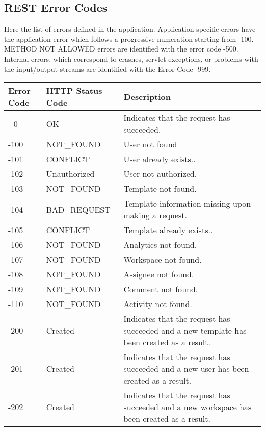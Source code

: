 \subsection{REST Error Codes}

Here the list of errors defined in the application. Application specific errors have the application error which follows a progressive numeration starting from -100. METHOD NOT ALLOWED errors are identified with the error code -500. Internal errors, which correspond to crashes, servlet exceptions, or problems with the input/output streams are identified with the Error Code -999.

\begin{longtable}{|p{}|p{} |p{}|} 
\hline
\textbf{Error Code} & \textbf{HTTP Status Code} & \textbf{Description} \\\hline
-  0  & OK                       & Indicates that the request has succeeded. \\ \hline
-100  & NOT\_FOUND               & User not found\\ \hline
-101  & CONFLICT                 & User already exists.. \\ \hline
-102  & Unauthorized             & User not authorized. \\ \hline
-103  & NOT\_FOUND               & Template not found.\\ \hline
-104  & BAD\_REQUEST             & Template information missing upon making a request. \\ \hline
-105  & CONFLICT                 & Template already exists.. \\ \hline
-106  & NOT\_FOUND               & Analytics not found.\\ \hline
-107  & NOT\_FOUND               & Workspace not found.\\ \hline
-108  & NOT\_FOUND               & Assignee not found.\\ \hline
-109  & NOT\_FOUND               & Comment not found.\\ \hline
-110  & NOT\_FOUND               & Activity not found.\\ \hline
-200  & Created                  & Indicates that the request has succeeded and a new template has been created as a result. \\ \hline
-201  & Created                  & Indicates that the request has succeeded and a new user has been created as a result. \\ \hline
-202  & Created                  & Indicates that the request has succeeded and a new workspace has been created as a result. \\ \hline

\end{longtable}
